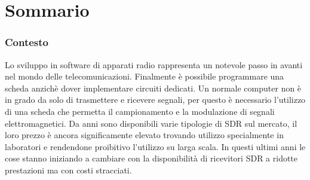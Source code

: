 \chapter*{Sommario} %
\label{sommario}




\subsection{Contesto}
Lo sviluppo in software di apparati radio rappresenta un notevole passo in avanti nel mondo delle telecomunicazioni. Finalmente è possibile programmare una scheda anzichè dover implementare circuiti dedicati. Un normale computer non è in grado da solo di trasmettere e ricevere segnali, per questo è necessario l'utilizzo di una scheda che permetta il campionamento e la modulazione di segnali elettromagnetici.
Da anni sono disponibili varie tipologie di SDR sul mercato, il loro prezzo è ancora significamente elevato trovando utilizzo specialmente in laboratori e rendendone proibitivo l'utilizzo su larga scala. In questi ultimi anni le cose stanno iniziando a cambiare con la disponibilità di ricevitori SDR a ridotte prestazioni ma con costi stracciati.
